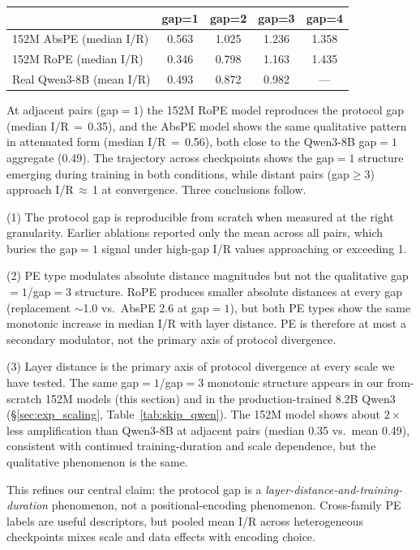 \documentclass{article}
\begin{document}
\begin{center}
\small
\begin{tabular}{lcccc}
\toprule
& gap=1 & gap=2 & gap=3 & gap=4 \\
\midrule
152M AbsPE (median I/R) & 0.563 & 1.025 & 1.236 & 1.358 \\
152M RoPE  (median I/R) & 0.346 & 0.798 & 1.163 & 1.435 \\
Real Qwen3-8B (mean I/R) & 0.493 & 0.872 & 0.982 & --- \\
\bottomrule
\end{tabular}
\end{center}

At adjacent pairs (gap${=}1$) the 152M RoPE model reproduces the protocol gap (median I/R\,$=$\,0.35), and the AbsPE model shows the same qualitative pattern in attenuated form (median I/R\,$=$\,0.56), both close to the Qwen3-8B gap${=}1$ aggregate (0.49). The trajectory across checkpoints shows the gap${=}1$ structure emerging during training in both conditions, while distant pairs (gap${\geq}3$) approach I/R\,$\approx$\,1 at convergence. Three conclusions follow.

(1) The protocol gap is reproducible from scratch when measured at the right granularity. Earlier ablations reported only the mean across all pairs, which buries the gap${=}1$ signal under high-gap I/R values approaching or exceeding 1.

(2) PE type modulates absolute distance magnitudes but not the qualitative gap${=}1$/gap${=}3$ structure. RoPE produces smaller absolute distances at every gap (replacement $\sim$1.0 vs.\ AbsPE 2.6 at gap${=}1$), but both PE types show the same monotonic increase in median I/R with layer distance. PE is therefore at most a secondary modulator, not the primary axis of protocol divergence.

(3) Layer distance is the primary axis of protocol divergence at every scale we have tested. The same gap${=}1$/gap${=}3$ monotonic structure appears in our from-scratch 152M models (this section) and in the production-trained 8.2B Qwen3 (\S\ref{sec:exp_scaling}, Table~\ref{tab:skip_qwen}). The 152M model shows about $2\times$ less amplification than Qwen3-8B at adjacent pairs (median 0.35 vs.\ mean 0.49), consistent with continued training-duration and scale dependence, but the qualitative phenomenon is the same.

This refines our central claim: the protocol gap is a \emph{layer-distance-and-training-duration} phenomenon, not a positional-encoding phenomenon. Cross-family PE labels are useful descriptors, but pooled mean I/R across heterogeneous checkpoints mixes scale and data effects with encoding choice.
\end{document}

